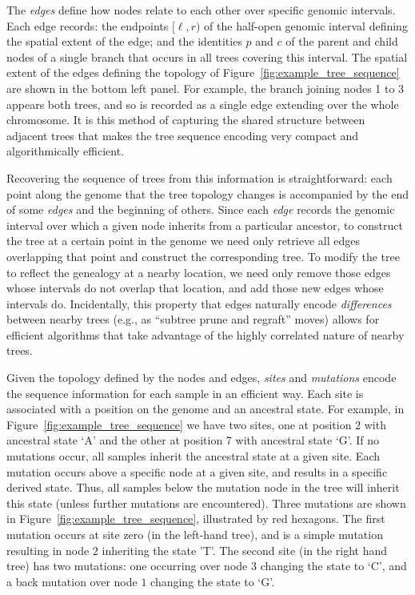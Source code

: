 \documentclass{article}
\begin{document}
The \emph{edges} define how nodes relate to each other over specific genomic intervals. 
Each edge records: 
the endpoints $[\ell, r)$ of the half-open genomic interval defining the
spatial extent of the edge; 
and the identities $p$ and $c$ of the parent and child nodes
of a single branch that occurs in all trees covering this interval.
The spatial extent of the edges defining the topology of Figure~\ref{fig:example_tree_sequence}
are shown in the bottom left panel. 
For example, the branch joining nodes 1 to 3 appears both trees,
and so is recorded as a single edge extending over the whole chromosome. 
It is this method of capturing the shared structure between adjacent trees that makes the
tree sequence encoding very compact and algorithmically efficient.

Recovering the sequence of trees from this information is straightforward:
each point along the genome that the tree topology changes
is accompanied by the end of some \emph{edges} and the beginning of others.
Since each \emph{edge} records the genomic interval 
over which a given node inherits from a particular ancestor,
to construct the tree at a certain point in the genome
we need only retrieve all edges overlapping that point
and construct the corresponding tree.
To modify the tree to reflect the genealogy at a nearby location,
we need only remove those edges whose intervals do not overlap that location,
and add those new edges whose intervals do.
Incidentally, this property that edges naturally encode \emph{differences}
between nearby trees (e.g., as ``subtree prune and regraft'' moves)
allows for efficient algorithms that take advantage
of the highly correlated nature of nearby trees.

Given the topology defined by the nodes and edges, \emph{sites} and \emph{mutations}
encode the sequence information for each sample in an efficient way. Each site
is associated with a position on the genome and an ancestral state. For example,
in Figure~\ref{fig:example_tree_sequence} we have two sites, one at position
2 with ancestral state `A' and the other at position 7 with ancestral state `G'. If
no mutations occur, all samples inherit the ancestral state at a given site.
Each mutation occurs above a specific node at a given site, 
and results in a specific derived state. 
Thus, all samples below the mutation node in the tree will inherit this state 
(unless further mutations are encountered). 
Three mutations are shown in Figure~\ref{fig:example_tree_sequence}, 
illustrated by red hexagons. 
The first mutation occurs at site zero (in the left-hand tree), and is a simple
mutation resulting in node $2$ inheriting the state 'T'. 
The second site (in the right hand tree) has two mutations: 
one occurring over node $3$ changing the state to `C', 
and a back mutation over node $1$ changing the state to `G'.
\end{document}
